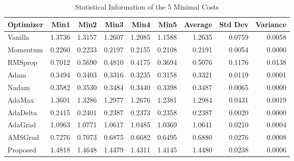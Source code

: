 \begin{table}
\caption{Statistical Information of the 5 Minimal Costs}
\label{tab:min_costs}
\begin{tabular}{lrrrrrrrr}
\toprule
Optimizer & Min1 & Min2 & Min3 & Min4 & Min5 & Average & Std Dev & Variance \\
\midrule
Vanilla & 1.3736 & 1.3157 & 1.2607 & 1.2085 & 1.1588 & 1.2635 & 0.0759 & 0.0058 \\
Momentum & 0.2260 & 0.2233 & 0.2197 & 0.2155 & 0.2108 & 0.2191 & 0.0054 & 0.0000 \\
RMSprop & 0.7012 & 0.5690 & 0.4810 & 0.4175 & 0.3694 & 0.5076 & 0.1176 & 0.0138 \\
Adam & 0.3494 & 0.3403 & 0.3316 & 0.3235 & 0.3158 & 0.3321 & 0.0119 & 0.0001 \\
Nadam & 0.3582 & 0.3530 & 0.3484 & 0.3440 & 0.3398 & 0.3487 & 0.0065 & 0.0000 \\
AdaMax & 1.3601 & 1.3286 & 1.2977 & 1.2676 & 1.2381 & 1.2984 & 0.0431 & 0.0019 \\
AdaDelta & 0.2415 & 0.2401 & 0.2387 & 0.2373 & 0.2358 & 0.2387 & 0.0020 & 0.0000 \\
AdaGrad & 1.0963 & 1.0771 & 1.0617 & 1.0485 & 1.0369 & 1.0641 & 0.0210 & 0.0004 \\
AMSGrad & 0.7276 & 0.7073 & 0.6875 & 0.6682 & 0.6495 & 0.6880 & 0.0276 & 0.0008 \\
Proposed & 1.4818 & 1.4648 & 1.4479 & 1.4311 & 1.4145 & 1.4480 & 0.0238 & 0.0006 \\
\bottomrule
\end{tabular}
\end{table}
